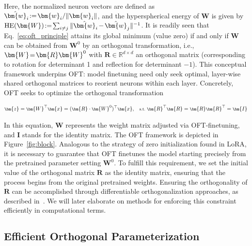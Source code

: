 Here, the normalized neuron vectors are defined as $\thickmuskip=2mu \medmuskip=2mu \hat{\bm{w}}_i:=\bm{w}_i/\|\bm{w}_i\|$, and the hyperspherical energy of $\bm{W}$ is given by $\thickmuskip=2mu \medmuskip=2mu \text{HE}(\bm{W}):= \sum_{i\neq j} \|\hat{\bm{w}}_i-\hat{\bm{w}}_j\|^{-1}$. It is readily seen that Eq.~\eqref{eq:oft_principle} attains its global minimum (value zero) if and only if $\bm{W}$ can be obtained from $\bm{W}^0$ by an orthogonal transformation, i.e., $\thickmuskip=2mu \medmuskip=2mu \bm{W} = \bm{R}\bm{W}^0$ with $\bm{R}\in\mathbb{R}^{d\times d}$ an orthogonal matrix (corresponding to rotation for determinant 1 and reflection for determinant $-1$). This conceptual framework underpins OFT: model finetuning need only seek optimal, layer-wise shared orthogonal matrices to reorient neurons within each layer. Concretely, OFT seeks to optimize the orthogonal transformation

\begin{equation}\label{eq:oft_general}
    \footnotesize
    \bm{z}=\bm{W}^\top\bm{x}=(\bm{R}\cdot\bm{W}^0)^\top\bm{x},~~~\text{s.t.}~\bm{R}^\top\bm{R}=\bm{R}\bm{R}^\top=\bm{I}
\end{equation}

In this equation, $\bm{W}$ represents the weight matrix adjusted via OFT-finetuning, and $\bm{I}$ stands for the identity matrix. The OFT framework is depicted in Figure~\ref{fig:block}. Analogous to the strategy of zero initialization found in LoRA, it is necessary to guarantee that OFT finetunes the model starting precisely from the pretrained parameter setting $\bm{W}^0$. To fulfill this requirement, we set the initial value of the orthogonal matrix $\bm{R}$ as the identity matrix, ensuring that the process begins from the original pretrained weights. Ensuring the orthogonality of $\bm{R}$ can be accomplished through differentiable orthogonalization approaches, as described in~\cite{liu2021orthogonal,lezcano2019cheap}. We will later elaborate on methods for enforcing this constraint efficiently in computational terms.

\subsection{Efficient Orthogonal Parameterization}\label{sect:eff_ortho}

